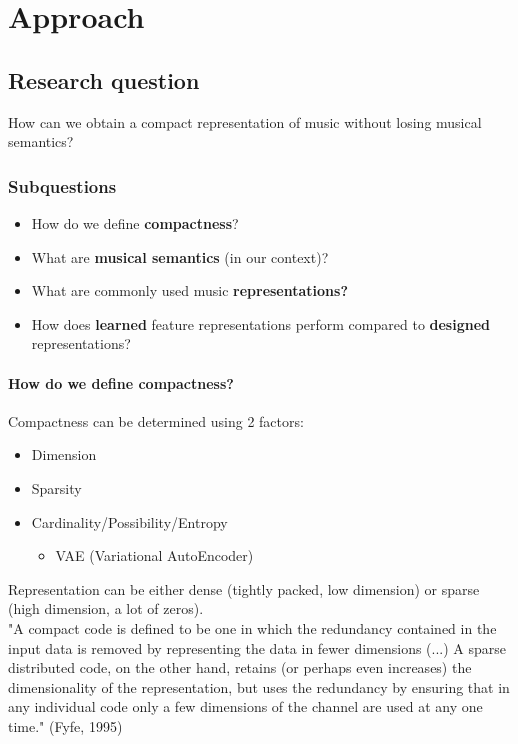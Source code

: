 \chapter{Approach}

\section{Research question}

How can we obtain a compact representation of music without losing musical semantics?

\subsection{Subquestions}

\begin{itemize}
	\item{How do we define \textbf{compactness}?}
	\item{What are \textbf{musical semantics} (in our context)?}
	\item{What are commonly used music \textbf{representations?}}
	\item{How does \textbf{learned} feature representations perform compared to \textbf{designed} representations?}
\end{itemize}

\subsubsection{How do we define compactness?}
Compactness can be determined using 2 factors:

\begin{itemize}
	\item{Dimension}
	\item{Sparsity}
	\item{Cardinality/Possibility/Entropy}
	\begin{itemize}
		\item{VAE (Variational AutoEncoder)}
	\end{itemize}
\end{itemize}

Representation can be either dense (tightly packed, low dimension) or sparse (high dimension, a lot of zeros). \\

"A compact code is defined to be one in which the redundancy contained in the input data is removed by representing the data in fewer dimensions (...) A sparse distributed code, on the other hand, retains (or perhaps even increases) the dimensionality of the representation, but uses the redundancy by ensuring that in any individual code only a few dimensions of the channel are used at any one time." (Fyfe, 1995) \\


